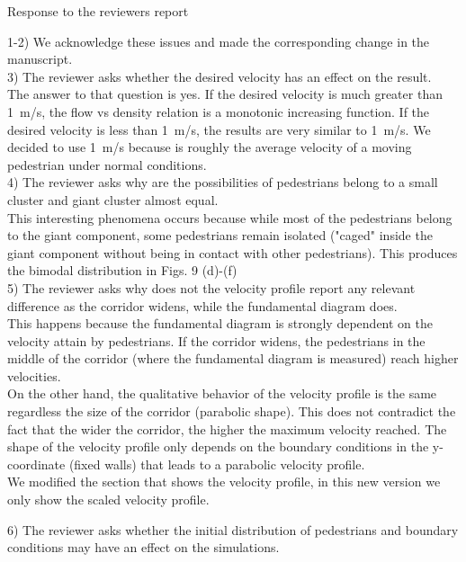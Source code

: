 \documentclass[a4paper,12pt]{letter}
\begin{document}
\begin{letter}{Response to the reviewers report}
{1-2) We acknowledge these issues and made the corresponding change in the 
manuscript.\\

3) The reviewer asks whether the desired velocity has an effect on the result.\\

The answer to that question is yes. If the desired velocity is much greater than 1~m/s, the flow vs density relation is a monotonic increasing function. If the desired velocity is less than 1~m/s, the results are very similar to 1~m/s. We decided to use 1~m/s because is roughly the average velocity of a moving pedestrian under normal conditions. \\

4) The reviewer asks why are the possibilities of pedestrians belong to a small cluster and giant cluster almost equal. \\

This interesting phenomena occurs because while most of the pedestrians belong to the giant component, some pedestrians remain isolated ("caged" inside the giant component without being in contact with other pedestrians). This produces the bimodal distribution in Figs. 9 (d)-(f)\\

5) The reviewer asks why does not the velocity profile report any relevant difference as the corridor widens, while the fundamental diagram does.\\

This happens because the fundamental diagram is strongly dependent on the velocity attain by pedestrians. If the corridor widens, the pedestrians in the middle of the corridor (where the fundamental diagram is measured) reach higher velocities. \\

On the other hand, the qualitative behavior of the velocity profile is the same regardless the size of the corridor (parabolic shape). This does not contradict the fact that the wider the corridor, the higher the maximum velocity reached. The shape of the velocity profile only depends on the boundary conditions in the y-coordinate (fixed walls) that leads to a parabolic velocity profile. \\

We modified the section that shows the velocity profile, in this new version we only show the scaled velocity profile. 

6) The reviewer asks whether the initial distribution of pedestrians and boundary conditions may have an effect on the simulations.\\

}
\end{letter}
\end{document}
